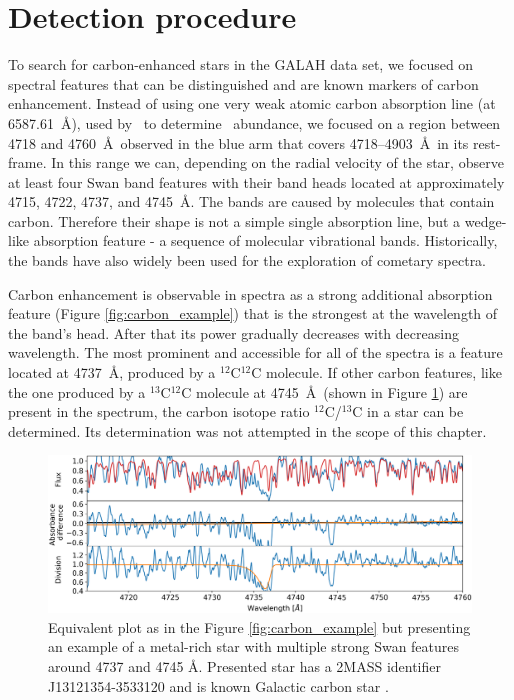 \section{Detection procedure}
\label{sec:classification_cemp}
To search for carbon-enhanced stars in the GALAH data set, we focused on spectral features that can be distinguished and are known markers of carbon enhancement. Instead of using one very weak atomic carbon absorption line (at 6587.61~\AA), used by \TC\ to determine \Cfe\ abundance, we focused on a region between 4718 and 4760~\AA\ observed in the blue arm that covers 4718--4903~\AA\ in its rest-frame. In this range we can, depending on the radial velocity of the star, observe at least four Swan band features \cite{1927RSPTA.226..157J} with their band heads located at approximately 4715, 4722, 4737, and 4745~\AA. The bands are caused by molecules that contain carbon. Therefore their shape is not a simple single absorption line, but a wedge-like absorption feature - a sequence of molecular vibrational bands. Historically, the bands have also widely been used for the exploration of cometary spectra.

Carbon enhancement is observable in spectra as a strong additional absorption feature (Figure \ref{fig:carbon_example}) that is the strongest at the wavelength of the band's head. After that its power gradually decreases with decreasing wavelength. The most prominent and accessible for all of the spectra is a feature located at 4737~\AA, produced by a $^{12}$C$^{12}$C molecule. If other carbon features, like the one produced by a $^{13}$C$^{12}$C molecule at 4745~\AA\ (shown in Figure \ref{fig:carbon_example2}) are present in the spectrum, the carbon isotope ratio $^{12}$C/$^{13}$C in a star can be determined. Its determination was not attempted in the scope of this chapter.

\begin{figure}
	\centering
	\includegraphics[width=\textwidth]{rich_160515003401143.png}
	\caption{Equivalent plot as in the Figure \ref{fig:carbon_example} but presenting an example of a metal-rich star with multiple strong Swan features around 4737 and 4745 \AA. Presented star has a 2MASS identifier J13121354-3533120 and is known Galactic carbon star \cite{2001BaltA..10....1A}.}
	\label{fig:carbon_example2}
\end{figure}

